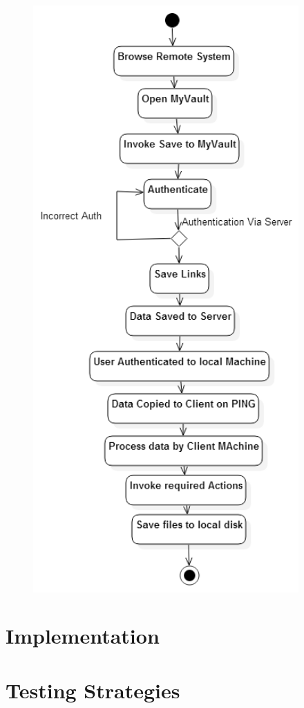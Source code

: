 \documentclass[a4paper]{report}
\begin{document}
\begin{figure}
\center

\includegraphics[width=4in]{MyVault_Activity.png}
\end{figure}
 

\chapter{Implementation}
\chapter{Testing Strategies}
\end{document}
